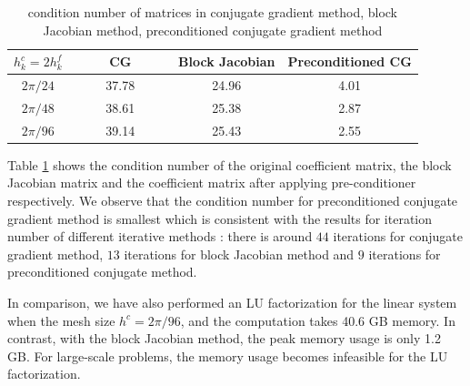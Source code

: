 \begin{table}[htbp]
	\begin{center}
		\begin{tabular}{|c|c c c|}
			\hline
			$h^c_k = 2h^f_k$   & ~~~~ CG ~~~~& Block Jacobian & Preconditioned CG  \\
			\hline
			$2\pi/24$ &37.78& 24.96& 4.01\\
			\hline
			$2\pi/48$ &38.61 & 25.38 & 2.87\\
			\hline 
			$2\pi/96$ &39.14 &25.43 & 2.55\\
			\hline
		\end{tabular}
	\end{center}
	\caption{condition number of matrices in conjugate gradient method, block Jacobian method, preconditioned conjugate gradient method}\label{condition_number}
\end{table} 
Table \ref{condition_number} shows the condition number of the original coefficient matrix, the block Jacobian matrix and the coefficient matrix after applying pre-conditioner respectively. We observe that the condition number for preconditioned conjugate gradient method is smallest which is consistent with the results for iteration number of different iterative methods : there is around $44$ iterations for conjugate gradient method, $13$ iterations for block Jacobian method and $9$ iterations for preconditioned conjugate method.

In comparison, we have also performed an LU factorization for the linear system when the mesh size $h^c = 2\pi/96$, and the computation takes 40.6 GB memory. In contrast, with the block Jacobian method, the peak memory usage is only 1.2 GB. For large-scale problems, the memory usage becomes infeasible for the LU factorization. 

